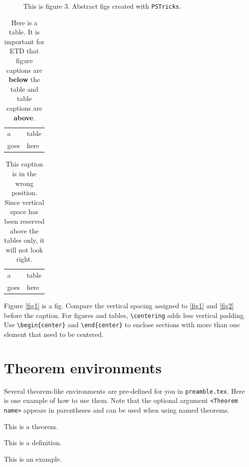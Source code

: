\begin{figure}[htpb]
\label{fig3}
\centering

\caption{This is figure 3. Abstract figs created with \texttt{PSTricks}.}
\end{figure}

\begin{table}
\caption{Here is a table. It is important for ETD that figure captions are \textbf{below} the table and table captions are \textbf{above}.}
\centering
\begin{tabular}{ll}
a & table\\
goes& here\\
\end{tabular}
\end{table}

\begin{table}
\centering
\begin{tabular}{ll}
a & table\\
goes& here\\
\end{tabular}
\caption{This caption is in the wrong position. Since vertical space has been reserved above the tables only, it will not look right.}
\end{table}

Figure \ref{fig1} is a fig. Compare the vertical spacing assigned to \cref{fig1} and \cref{fig2} before the caption. For figures and tables, \verb|\centering| adds less vertical padding. Use \verb|\begin{center}| and \verb|\end{center}| to enclose sections with more than one element that need to be centered. 

\section{Theorem environments}
Several theorem-like environments are pre-defined for you in \texttt{preamble.tex}. Here is one example of how to use them. Note that the optional argument \verb|<Theorem name>| appears in parentheses and can be used when using named theorems. 

\begin{Thm}
\label{mythm}
This is a theorem.
\end{Thm}

\begin{Def}
This is a definition.
\end{Def}

\begin{Ex}
This is an example. 
\end{Ex}


